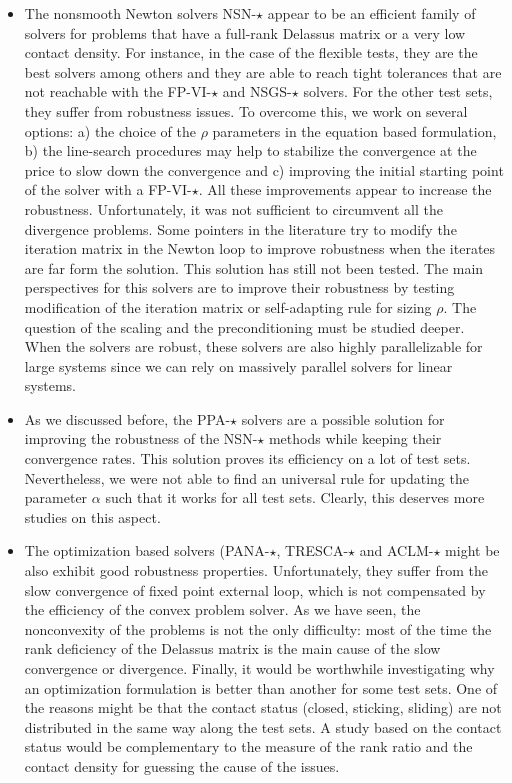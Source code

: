 \begin{itemize}
\item The nonsmooth Newton solvers {\sf NSN-$\star$} appear to be an efficient family of solvers for problems that have a full-rank Delassus matrix or a very low contact density. For instance, in the case of the flexible tests, they are the best solvers among others and they are able to reach tight tolerances that are not reachable with the {\sf FP-VI-$\star$}  and {\sf NSGS-$\star$} solvers. For the other test sets, they suffer from robustness issues. To overcome this, we work on several options:  a) the choice of the $\rho$ parameters in the equation based formulation, b) the line-search procedures may help to stabilize the convergence at the price to slow down the convergence and c) improving the initial starting point of the solver with a {\sf FP-VI-$\star$}. All these improvements appear to increase the robustness. Unfortunately, it was not sufficient to circumvent all the divergence problems. Some pointers in the literature try to modify the iteration matrix in the Newton loop to improve robustness when the iterates are far form the solution. This solution has still not been tested. The main perspectives for this solvers are to improve their robustness by testing modification of the iteration matrix or self-adapting rule for sizing $\rho$. The question of the scaling and the preconditioning must be studied deeper. When the solvers are robust, these solvers are also highly parallelizable for large systems since we can rely on massively parallel solvers for linear systems.

\item As we discussed before, the {\sf PPA-$\star$} solvers are a possible solution for improving the robustness of the {\sf NSN-$\star$} methods while keeping their convergence rates. This solution proves its efficiency on a lot of test sets. Nevertheless, we were not able to find an universal rule for updating the parameter $\alpha$ such that it works for all test sets. Clearly, this deserves more studies  on this aspect.

\item The optimization based solvers ({\sf PANA-$\star$, TRESCA-$\star$ and ACLM-$\star$} might be also exhibit good robustness properties. Unfortunately, they suffer from the slow convergence of fixed point external loop, which is not compensated by the efficiency of the convex problem solver. As we have seen, the nonconvexity of the problems is not the only difficulty: most of the time the rank deficiency of the Delassus matrix is the main cause of the slow convergence or divergence. Finally, it would be worthwhile investigating why an optimization formulation is better than another for some test sets. One of the reasons might be that the contact status (closed, sticking, sliding) are not distributed in the same  way along the test sets. A study based on the contact status would be complementary to the measure of the rank ratio and the contact density for guessing the cause of the issues.


\end{itemize}




